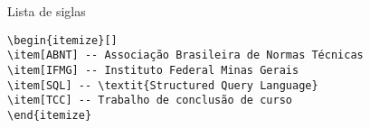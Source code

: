\begin{codigo}[!htb]
\caption{Lista de siglas} \label{codigo:lista_siglas}
\begin{Verbatim}[frame=lines]
\begin{itemize}[]
\item[ABNT] -- Associação Brasileira de Normas Técnicas
\item[IFMG] -- Instituto Federal Minas Gerais
\item[SQL] -- \textit{Structured Query Language}
\item[TCC] -- Trabalho de conclusão de curso
\end{itemize}
\end{Verbatim}
\end{codigo}
